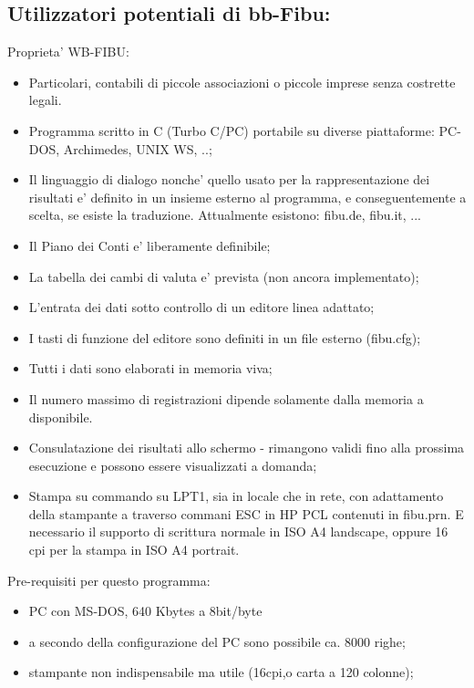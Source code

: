 \documentclass[12pt]{report}
\begin{document}
\subsection{Utilizzatori potentiali di bb-Fibu:}
Proprieta' WB-FIBU:
\begin{itemize}

\item Particolari, contabili di piccole associazioni o piccole imprese senza costrette legali.

\item Programma scritto in C (Turbo C/PC) portabile su diverse piattaforme:
PC-DOS, Archimedes, UNIX WS, ..;

\item Il linguaggio di dialogo nonche' quello usato per la rappresentazione
dei risultati e' definito in un insieme esterno al programma, e
conseguentemente a scelta, se esiste la traduzione. Attualmente esistono:
fibu.de, fibu.it, ...

\item Il Piano dei Conti e' liberamente definibile;

\item La tabella dei cambi di valuta e' prevista (non ancora implementato);

\item L'entrata dei dati sotto controllo di un editore linea adattato;

\item I tasti di funzione del editore sono definiti in un file esterno
(fibu.cfg);

\item Tutti i dati sono elaborati in memoria viva;

\item Il numero massimo di registrazioni dipende solamente dalla memoria a
disponibile.

\item Consulatazione dei risultati allo schermo - rimangono validi fino alla
prossima esecuzione e possono essere visualizzati a domanda;

\item Stampa su commando su LPT1, sia in locale che in rete, con adattamento
della stampante a traverso commani ESC in HP PCL contenuti in fibu.prn.  E
necessario il supporto di scrittura normale in ISO A4 landscape, oppure 16 cpi
per la stampa in ISO A4 portrait.

\end{itemize}
     
Pre-requisiti per questo programma:
\begin{itemize}
\item PC con MS-DOS, 640 Kbytes a 8bit/byte
\item a secondo della configurazione del PC sono possibile ca. 8000 righe;
\item stampante non indispensabile ma utile (16cpi,o carta a 120 colonne);
\end{itemize}
\end{document}
